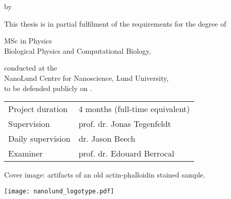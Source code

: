 {
\pagestyle{empty}



\clearpage

\begin{titlepage}
	
	\frutigerfont
	
	\begin{center}

		
		{\Huge \garamondfont \thetitle}
		
		\smallskip
		by
		\bigskip
		
		{\Large \garamondfont \theauthor}
		
		\bigskip
		\bigskip
		
		This thesis is in partial fulfilment of the requirements for the degree of 
		
		\bigskip
		
		{MSc in Physics} \\
		Biological Physics and Computational Biology,
		
		\bigskip
		
		conducted at the \\
		NanoLund Centre for Nanoscience, Lund University,\\
		to be defended publicly on .
		
		
		\vspace{5cm}
		
		\vfill
		\begin{tabular}{ll}
			Project duration & 4 months (full-time equivalent)\\
			Supervision & prof. dr. Jonas Tegenfeldt\\
			Daily supervision & dr. Jason Beech\\
			Examiner & prof. dr. Edouard Berrocal
		\end{tabular}
	
		\bigskip
	
		Cover image: artifacts of an old actin-phalloidin stained sample.
	
		\vspace{3cm}
		
		\texttt{[image: nanolund\_logotype.pdf]}
	
	
	\end{center}
\end{titlepage}
}